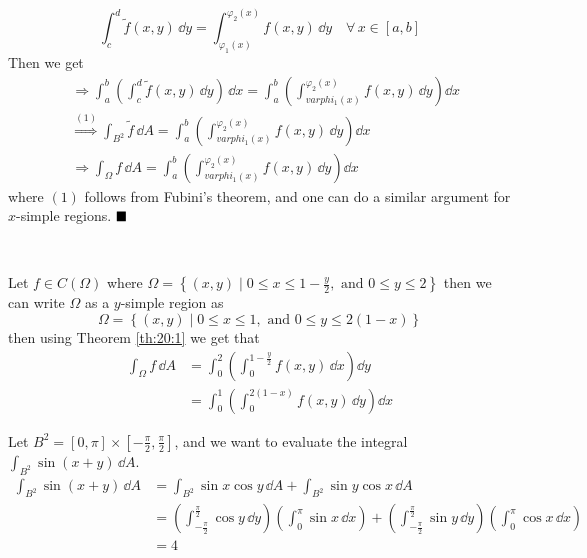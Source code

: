 \documentclass[../Analysis-3.tex]{subfiles}
\begin{document}
\[
  \int_c^d \tilde{f}(x,y) \, \dd y = \int_{\varphi_1(x)}^{\varphi_2(x)} f(x,y) \, \dd y \quad \forall \, x \in [a,b]
\]
Then we get
\begin{align*}
   & \Longrightarrow \int_a^b \left( \int_c^d \tilde{f}(x,y) \, \dd y\right)\, \dd x = \int_a^b \left( \int_{varphi_1(x)}^{\varphi_2(x)} f(x,y) \, \dd y\right) \dd x \\
   & \overset{(1)}{\Longrightarrow} \int_{B^2} \tilde{f} \, \dd A = \int_a^b \left( \int_{varphi_1(x)}^{\varphi_2(x)} f(x,y) \, \dd y\right) \dd x                    \\
   & \Longrightarrow \int_{\Omega} f \, \dd A = \int_a^b \left( \int_{varphi_1(x)}^{\varphi_2(x)} f(x,y) \, \dd y\right) \dd x
\end{align*}
where $(1)$ follows from Fubini's theorem, and one can do a similar argument for $x$-simple regions. $\hfill \blacksquare$

\

\begin{Eg}{}{}
  Let $f \in C(\Omega)$ where $\Omega = \left\{ (x,y) \mid 0 \leq x \leq 1 - \frac{y}{2}, \mbox{ and } 0 \leq y \leq 2 \right\}$ then we can write $\Omega$ as a $y$-simple region as
  \[
    \Omega = \left\{ (x,y) \mid 0 \leq x \leq 1, \mbox{ and } 0 \leq y \leq 2(1-x) \right\}
  \]
  then using Theorem \ref{th:20:1} we get that
  \begin{align*}
    \int_{\Omega} f \, \dd A & = \int_0^2 \left( \int_0^{1-\frac{y}{2}} f(x,y) \, \dd x\right) \dd y \\
                             & = \int_0^1 \left( \int_0^{2(1-x)} f(x,y) \, \dd y\right) \dd x
  \end{align*}
\end{Eg}

\begin{Eg}{}{}
  Let $B^2 = [0,\pi] \times [-\frac{\pi}{2}, \frac{\pi}{2}]$, and we want to evaluate the integral $\int_{B^2} \sin (x+y) \, \dd A$.
  \begin{align*}
    \int_{B^2}\sin(x+y) \, \dd A & = \int_{B^2} \sin x \cos y \, \dd A + \int_{B^2} \sin y \cos x \, \dd A                                                                                                                                                             \\
                                 & = \left( \int_{-\frac{\pi}{2}}^{\frac{\pi}{2}} \cos y \, \dd y\right)\left( \int_{0}^{\pi} \sin x \, \dd x\right) + \left( \int_{-\frac{\pi}{2}}^{\frac{\pi}{2}} \sin y \, \dd y\right)\left( \int_{0}^{\pi} \cos x \, \dd x\right) \\
                                 & = 4
  \end{align*}
\end{Eg}
\end{document}

